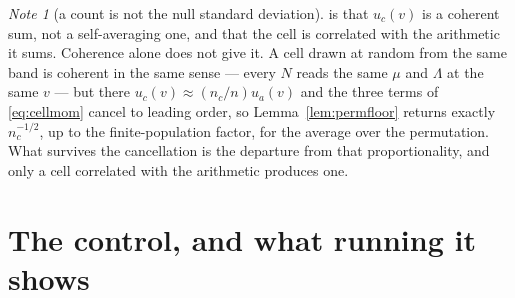 \documentclass[11pt,a4paper]{article}
\theoremstyle{plain}
\theoremstyle{definition}
\theoremstyle{remark}
\newtheorem{note}[theorem]{Note}
\begin{document}
\begin{note}[a count is not the null standard deviation]
is that $u_c(v)$ is a coherent sum, not a self-averaging one, and that
the cell is correlated with the arithmetic it sums. Coherence alone
does not give it. A cell drawn at random from the same band is
coherent in the same sense --- every $N$ reads the same $\mu$ and
$\Lambda$ at the same $v$ --- but there $u_c(v)\approx(n_c/n)u_a(v)$
and the three terms of \eqref{eq:cellmom} cancel to leading order, so
Lemma~\ref{lem:permfloor} returns exactly $n_c^{-1/2}$, up to the
finite-population factor, for the average over the permutation. What survives the cancellation is the
departure from that proportionality, and only a cell correlated with
the arithmetic produces one.
\end{note}

\section{The control, and what running it shows}\label{sec:placebo}
\end{document}
